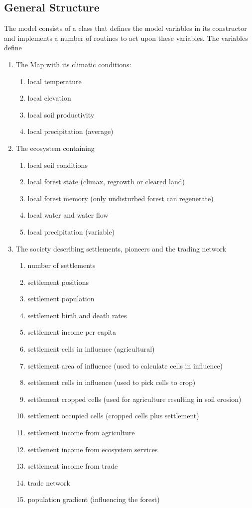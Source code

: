 \subsection{General Structure}
The model consists of a class that defines the model variables in its constructor and implements a number of routines to act upon these variables. The variables define
\begin{enumerate}
	\item The Map with its climatic conditions:
	\begin{enumerate}
		\item local temperature
		\item local elevation
		\item local soil productivity
		\item local precipitation (average)
	\end{enumerate}
	\item The ecosystem containing
	\begin{enumerate}
		\item local soil conditions
		\item local forest state (climax, regrowth or cleared land)
		\item local forest memory (only undisturbed forest can regenerate)
		\item local water and water flow
		\item local precipitation (variable)
	\end{enumerate}
	\item The society describing settlements, pioneers and the trading network
	\begin{enumerate}
		\item number of settlements
		\item settlement positions 
		\item settlement population
		\item settlement birth and death rates
		\item settlement income per capita
		\item settlement cells in influence (agricultural)
		\item settlement area of influence (used to calculate cells in influence)
		\item settlement cells in influence (used to pick cells to crop)
		\item settlement cropped cells (used for agriculture resulting in soil erosion)
		\item settlement occupied cells (cropped cells plus settlement)
		\item settlement income from agriculture
		\item settlement income from ecosystem services
		\item settlement income from trade
		\item trade network
		\item population gradient (influencing the forest)
	\end{enumerate}

\end{enumerate}
